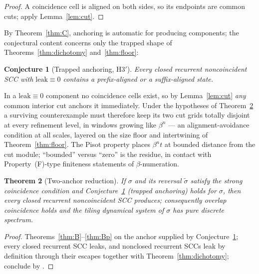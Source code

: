 \documentclass[11pt]{article}
\newtheorem{theorem}{Theorem}[section]
\newtheorem{conjecture}[theorem]{Conjecture}
\begin{document}
\begin{proof}
A coincidence cell is aligned on both sides, so its endpoints are common
cuts; apply Lemma~\ref{lem:cut}.
\end{proof}

By Theorem~\ref{thm:C}, anchoring is automatic for producing components;
the conjectural content concerns only the trapped shape of
Theorems~\ref{thm:dichotomy} and~\ref{thm:floor}:

\begin{conjecture}[Trapped anchoring, H3$'$]\label{conj:H3}
Every closed recurrent noncoincident SCC with $\mathrm{leak}\equiv0$
contains a prefix-aligned or a suffix-aligned state.
\end{conjecture}

In a $\mathrm{leak}\equiv0$ component no coincidence cells exist, so by
Lemma~\ref{lem:cut} \emph{any} common interior cut anchors it
immediately. Under the hypotheses of
Theorem~\ref{thm:reduction} a surviving counterexample must therefore
keep its two cut grids totally disjoint at every refinement level, in
windows growing like $\beta^n$ --- an alignment-avoidance condition at
all scales, layered on the size floor and intertwining of
Theorem~\ref{thm:floor}. The Pisot property places $\beta^n t$ at
bounded distance from the cut module; ``bounded'' versus ``zero'' is the
residue, in contact with Property~(F)-type finiteness statements of
$\beta$-numeration.

\begin{theorem}[Two-anchor reduction]\label{thm:reduction}
If $\sigma$ and its reversal $\tilde\sigma$ satisfy the strong
coincidence condition and Conjecture~\ref{conj:H3} (trapped anchoring) holds for $\sigma$,
then every closed recurrent noncoincident SCC produces; consequently
overlap coincidence holds and the tiling dynamical system of $\sigma$
has pure discrete spectrum.
\end{theorem}

\begin{proof}
Theorems~\ref{thm:B}--\ref{thm:Bp} on the anchor supplied by
Conjecture~\ref{conj:H3}; every closed recurrent SCC leaks, and
nonclosed recurrent SCCs leak by definition through their escapes
together with Theorem~\ref{thm:dichotomy}; conclude by
\cite{Sol97,AL11}.
\end{proof}
\end{document}
